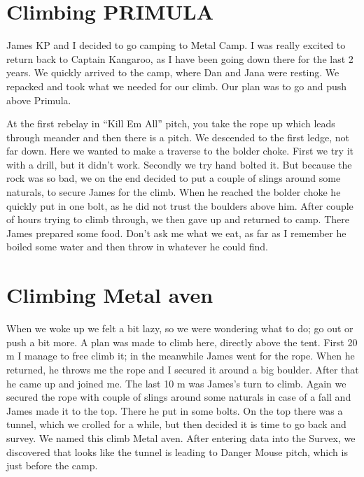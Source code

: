 
\section{Climbing PRIMULA}\label{climbing-primula}

James KP and I decided to go camping to Metal Camp. I was really excited
to return back to Captain Kangaroo, as I have been going down there for
the last 2 years. We quickly arrived to the camp, where Dan and Jana
were resting. We repacked and took what we needed for our climb. Our
plan was to go and push above Primula.

At the first rebelay in ``Kill Em All'' pitch, you take the rope up
which leads through meander and then there is a pitch. We descended to
the first ledge, not far down. Here we wanted to make a traverse to the
bolder choke. First we try it with a drill, but it didn't work. Secondly
we try hand bolted it. But because the rock was so bad, we on the end
decided to put a couple of slings around some naturals, to secure James
for the climb. When he reached the bolder choke he quickly put in one
bolt, as he did not trust the boulders above him. After couple of hours
trying to climb through, we then gave up and returned to camp. There
James prepared some food. Don't ask me what we eat, as far as I remember
he boiled some water and then throw in whatever he could find.


\section{Climbing Metal aven}\label{climbing-metal-aven}

When we woke up we felt a bit lazy, so we were wondering what to do; go
out or push a bit more. A plan was made to climb here, directly above
the tent. First 20 m I manage to free climb it; in the meanwhile James
went for the rope. When he returned, he throws me the rope and I secured
it around a big boulder. After that he came up and joined me. The last
10 m was James's turn to climb. Again we secured the rope with couple of
slings around some naturals in case of a fall and James made it to the
top. There he put in some bolts. On the top there was a tunnel, which we
crolled for a while, but then decided it is time to go back and survey.
We named this climb Metal aven. After entering data into the Survex, we
discovered that looks like the tunnel is leading to Danger Mouse pitch,
which is just before the camp.

